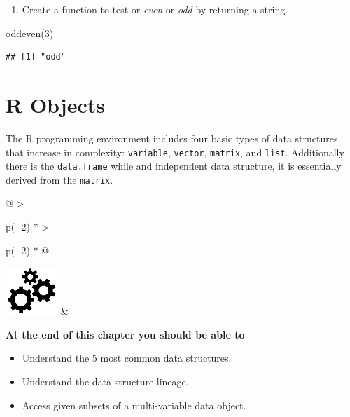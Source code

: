 \documentclass[
]{book}
\newenvironment{Shaded}{\begin{snugshade}}{\end{snugshade}}
\newcommand{\DecValTok}[1]{\textcolor[rgb]{0.00,0.00,0.81}{#1}}
\newcommand{\FunctionTok}[1]{\textcolor[rgb]{0.00,0.00,0.00}{#1}}
\newcommand{\NormalTok}[1]{#1}
\providecommand{\tightlist}{%
  \setlength{\itemsep}{0pt}\setlength{\parskip}{0pt}}
\begin{document}
\begin{enumerate}
\def\labelenumi{\arabic{enumi}.}
\setcounter{enumi}{6}
\tightlist
\item
  Create a function to test or \emph{even} or \emph{odd} by returning a string.
\end{enumerate}

\begin{Shaded}
\begin{Highlighting}[]
\FunctionTok{oddeven}\NormalTok{(}\DecValTok{3}\NormalTok{)}
\end{Highlighting}
\end{Shaded}

\begin{verbatim}
## [1] "odd"
\end{verbatim}

\hypertarget{r-objects}{%
\chapter{R Objects}\label{r-objects}}

The R programming environment includes four basic types of data structures that increase in complexity: \texttt{variable}, \texttt{vector}, \texttt{matrix}, and \texttt{list}. Additionally there is the \texttt{data.frame} while and independent data structure, it is essentially derived from the \texttt{matrix}.

\hfill\break

\begin{longtable}[]{@{}
  >{\raggedright\arraybackslash}p{(\columnwidth - 2\tabcolsep) * }
  >{\raggedright\arraybackslash}p{(\columnwidth - 2\tabcolsep) * }@{}}
\toprule\noalign{}
\endhead
\bottomrule\noalign{}
\endlastfoot
\includegraphics[width=\textwidth,height=0.70833in]{images/03.png} & \begin{minipage}[t]{\linewidth}\raggedright
\textbf{At the end of this chapter you should be able to}

\begin{itemize}
\item
  Understand the 5 most common data structures.
\item
  Understand the data structure lineage.
\item
  Access given subsets of a multi-variable data object.
\end{itemize}
\end{minipage} \\
\end{longtable}
\end{document}
